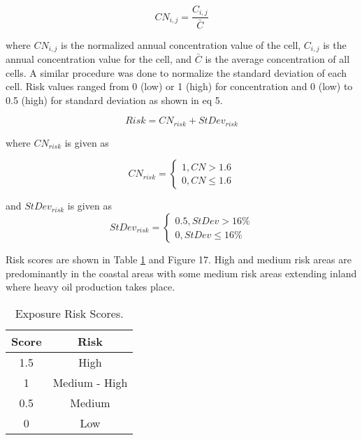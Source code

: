 \begin{equation}
\label{eq:normconcentrate}
CN_{i,j}=\frac{C_{i,j}}{\bar{C}}
\end{equation}

\noindent
where $CN_{i,j}$ is the normalized annual concentration value of the cell, $C_{i,j}$ is the annual concentration value for the cell, and $\bar{C}$ is the average concentration of all cells.  A similar procedure was done to normalize the standard deviation of each cell.  Risk values ranged from 0 (low) or 1 (high) for concentration and 0 (low) to 0.5 (high) for standard deviation as shown in eq 5. 

\begin{equation}
\label{eq:riskscore}
Risk = CN_{risk} + StDev_{risk}
\end{equation}

\noindent
where $CN_{risk}$ is given as

\begin{equation}
\label{eq:riskCN1}
CN_{risk} = \left\{\begin{matrix}
1, CN > 1.6\\ 
0, CN \leq 1.6
\end{matrix}\right.
\end{equation}

\noindent
and $StDev_{risk}$ is given as
\begin{equation}
\label{eq:riskCN2}
StDev_{risk} = \left\{\begin{matrix}
0.5, StDev > 16\%\\ 
0, StDev \leq 16\%
\end{matrix}\right.
\end{equation}

Risk scores are shown in Table \ref{tb:expriskscores} and Figure 17.  High and medium risk areas are predominantly in the coastal areas with some medium risk areas extending inland where heavy oil production takes place.

\begin{table}[!htb]
\centering
\caption{Exposure Risk Scores.}
\label{tb:expriskscores}
\begin{tabular}{@{}cc@{}}
\toprule
\textbf{Score} & \textbf{Risk} \\ \midrule
1.5            & High          \\
1              & Medium - High \\
0.5            & Medium        \\
0              & Low           \\ \bottomrule
\end{tabular}
\end{table}

